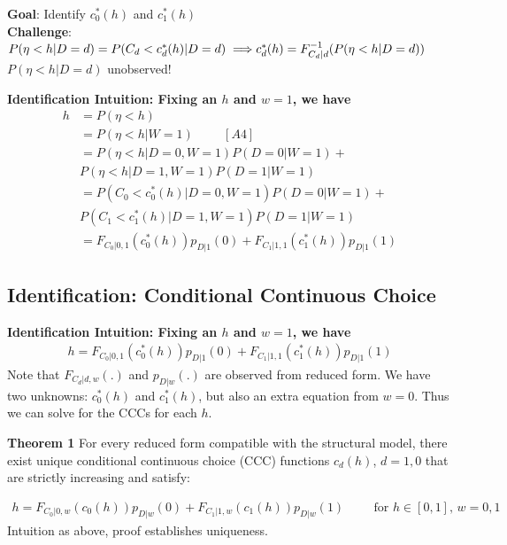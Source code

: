 \documentclass[
  letterpaper,
  DIV=11,
  numbers=noendperiod]{scrartcl}
\begin{document}
\textbf{Goal}: Identify \(c^{*}_0(h)\) and \(c^{*}_1(h)\)\\
\textbf{Challenge}:
\(P(\eta < h | D=d) = P(C_d < c^{*}_d(h)| D=d) \implies \\ c^{*}_d(h) = F_{C_d|d}^{-1}(P(\eta < h | D=d))\)
\(P(\eta < h | D=d)\) unobserved!

\textbf{Identification Intuition: Fixing an \(h\) and \(w=1\), we have}
\[
\begin{align}
 h &= P(\eta < h)\\
   &= P(\eta < h | W = 1) \hspace{1cm} [A4]\\
   &= P(\eta < h | D=0, W = 1)P(D=0| W = 1) + \\
   &P(\eta < h | D=1, W = 1)P(D=1| W = 1)\\
   &= P(C_0 < c^{*}_0(h) | D=0, W = 1)P(D=0| W = 1) + \\
   &P(C_1 < c^{*}_1(h) | D=1, W = 1)P(D=1| W = 1)\\
   &= F_{C_0|0,1}(c^{*}_0(h))p_{D|1}(0) + F_{C_1|1,1}(c^{*}_1(h))p_{D|1}(1)
\end{align}
\]

\subsection{Identification: Conditional Continuous
Choice}\label{identification-conditional-continuous-choice-1}

\textbf{Identification Intuition: Fixing an \(h\) and \(w=1\), we have}
\[
\begin{align}
 h = F_{C_0|0,1}(c^{*}_0(h))p_{D|1}(0) + F_{C_1|1,1}(c^{*}_1(h))p_{D|1}(1)
\end{align}
\] Note that \(F_{C_d|d,w}(.)\) and \(p_{D|w}(.)\) are observed from
reduced form. We have two unknowns: \(c^{*}_0(h)\) and \(c^{*}_1(h)\),
but also an extra equation from \(w=0\). Thus we can solve for the CCCs
for each \(h\).

\textbf{Theorem 1} For every reduced form compatible with the structural
model, there exist unique conditional continuous choice (CCC) functions
\(c_d(h)\), \(d=1,0\) that are strictly increasing and satisfy:

\[
\begin{align}
 h = F_{C_0|0,w}(c_0(h))p_{D|w}(0) + F_{C_1|1,w}(c_1(h))p_{D|w}(1) \hspace{1cm} \text{for $h \in [0,1]$, $w = 0,1$}
\end{align}
\] Intuition as above, proof establishes uniqueness.
\end{document}
